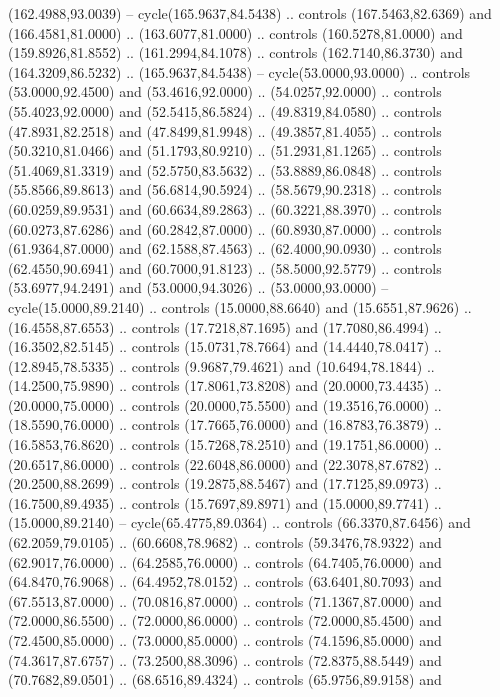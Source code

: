   (162.4988,93.0039) -- cycle(165.9637,84.5438) .. controls (167.5463,82.6369)
  and (166.4581,81.0000) .. (163.6077,81.0000) .. controls (160.5278,81.0000)
  and (159.8926,81.8552) .. (161.2994,84.1078) .. controls (162.7140,86.3730)
  and (164.3209,86.5232) .. (165.9637,84.5438) -- cycle(53.0000,93.0000) ..
  controls (53.0000,92.4500) and (53.4616,92.0000) .. (54.0257,92.0000) ..
  controls (55.4023,92.0000) and (52.5415,86.5824) .. (49.8319,84.0580) ..
  controls (47.8931,82.2518) and (47.8499,81.9948) .. (49.3857,81.4055) ..
  controls (50.3210,81.0466) and (51.1793,80.9210) .. (51.2931,81.1265) ..
  controls (51.4069,81.3319) and (52.5750,83.5632) .. (53.8889,86.0848) ..
  controls (55.8566,89.8613) and (56.6814,90.5924) .. (58.5679,90.2318) ..
  controls (60.0259,89.9531) and (60.6634,89.2863) .. (60.3221,88.3970) ..
  controls (60.0273,87.6286) and (60.2842,87.0000) .. (60.8930,87.0000) ..
  controls (61.9364,87.0000) and (62.1588,87.4563) .. (62.4000,90.0930) ..
  controls (62.4550,90.6941) and (60.7000,91.8123) .. (58.5000,92.5779) ..
  controls (53.6977,94.2491) and (53.0000,94.3026) .. (53.0000,93.0000) --
  cycle(15.0000,89.2140) .. controls (15.0000,88.6640) and (15.6551,87.9626) ..
  (16.4558,87.6553) .. controls (17.7218,87.1695) and (17.7080,86.4994) ..
  (16.3502,82.5145) .. controls (15.0731,78.7664) and (14.4440,78.0417) ..
  (12.8945,78.5335) .. controls (9.9687,79.4621) and (10.6494,78.1844) ..
  (14.2500,75.9890) .. controls (17.8061,73.8208) and (20.0000,73.4435) ..
  (20.0000,75.0000) .. controls (20.0000,75.5500) and (19.3516,76.0000) ..
  (18.5590,76.0000) .. controls (17.7665,76.0000) and (16.8783,76.3879) ..
  (16.5853,76.8620) .. controls (15.7268,78.2510) and (19.1751,86.0000) ..
  (20.6517,86.0000) .. controls (22.6048,86.0000) and (22.3078,87.6782) ..
  (20.2500,88.2699) .. controls (19.2875,88.5467) and (17.7125,89.0973) ..
  (16.7500,89.4935) .. controls (15.7697,89.8971) and (15.0000,89.7741) ..
  (15.0000,89.2140) -- cycle(65.4775,89.0364) .. controls (66.3370,87.6456) and
  (62.2059,79.0105) .. (60.6608,78.9682) .. controls (59.3476,78.9322) and
  (62.9017,76.0000) .. (64.2585,76.0000) .. controls (64.7405,76.0000) and
  (64.8470,76.9068) .. (64.4952,78.0152) .. controls (63.6401,80.7093) and
  (67.5513,87.0000) .. (70.0816,87.0000) .. controls (71.1367,87.0000) and
  (72.0000,86.5500) .. (72.0000,86.0000) .. controls (72.0000,85.4500) and
  (72.4500,85.0000) .. (73.0000,85.0000) .. controls (74.1596,85.0000) and
  (74.3617,87.6757) .. (73.2500,88.3096) .. controls (72.8375,88.5449) and
  (70.7682,89.0501) .. (68.6516,89.4324) .. controls (65.9756,89.9158) and

